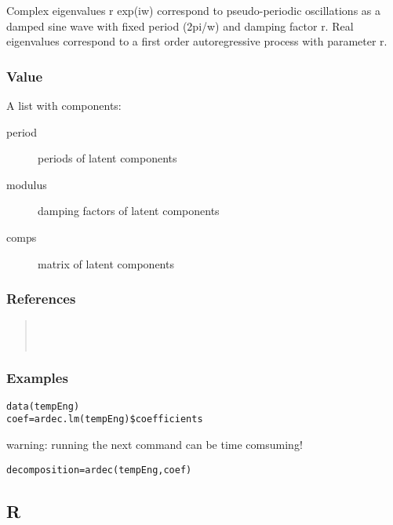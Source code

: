 \documentclass[11pt]{article}
\begin{document}
Complex eigenvalues r exp(iw) correspond to pseudo-periodic oscillations as a
damped sine wave with fixed period (2pi/w) and damping factor r. Real
eigenvalues correspond to a first order autoregressive process with parameter
r.
\subsubsection{Value}
\label{sec-1-2-5}

A list with components: 

\begin{description}
\item[period] periods of latent components
\item[modulus] damping factors of latent components
\item[comps] matrix of latent components
\end{description}
\subsubsection{References}
\label{sec-1-2-6}

\begin{verse}
\cite{west1997time} \\
\cite{west1997bayesian} \\
\end{verse}
\subsubsection{Examples}
\label{sec-1-2-7}

\lstset{language=R,numbers=none}
\begin{lstlisting}
data(tempEng)
coef=ardec.lm(tempEng)$coefficients
\end{lstlisting}

warning: running the next command can be time comsuming!
\lstset{language=R,numbers=none}
\begin{lstlisting}
decomposition=ardec(tempEng,coef)
\end{lstlisting}
\subsection{R}
\label{sec-1-3}
\end{document}
